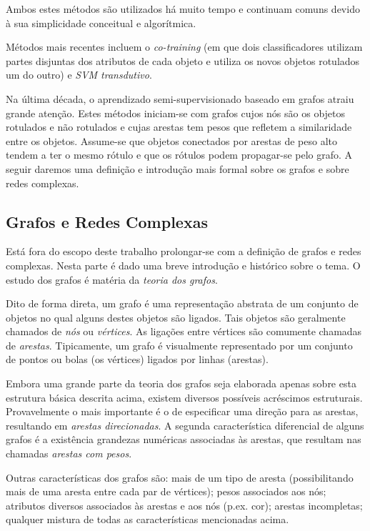 \documentclass[12pt]{article}
\begin{document}
Ambos estes métodos são utilizados há muito tempo e continuam comuns devido à sua simplicidade conceitual e algorítmica.

Métodos mais recentes incluem o \emph{co-training} (em que dois classificadores utilizam partes disjuntas dos atributos de cada objeto e utiliza os novos objetos rotulados um do outro) e \emph{SVM transdutivo}.

Na última década, o aprendizado semi-supervisionado baseado em grafos atraiu grande atenção. Estes métodos iniciam-se com grafos cujos nós são os objetos rotulados e não rotulados e cujas arestas tem pesos que refletem a similaridade entre os objetos. Assume-se que objetos conectados por arestas de peso alto tendem a ter o mesmo rótulo e que os rótulos podem propagar-se pelo grafo. A seguir daremos uma definição e introdução mais formal sobre os grafos e sobre redes complexas.

\subsection{Grafos e Redes Complexas}
Está fora do escopo deste trabalho prolongar-se com a definição de grafos e redes complexas. Nesta parte é dado uma breve introdução e histórico sobre o tema. O estudo dos grafos é matéria da \emph{teoria dos grafos}.

Dito de forma direta, um grafo é uma representação abstrata de um conjunto de objetos no qual alguns destes objetos são ligados. Tais objetos são geralmente chamados de \emph{nós} ou \emph{vértices}. As ligações entre vértices são comumente chamadas de \emph{arestas}. Tipicamente, um grafo é visualmente representado por um conjunto de pontos ou bolas (os vértices) ligados por linhas (arestas).

Embora uma grande parte da teoria dos grafos seja elaborada apenas sobre esta estrutura básica descrita acima, existem diversos possíveis acréscimos estruturais. Provavelmente o mais importante é o de especificar uma direção para as arestas, resultando em \emph{arestas direcionadas}. A segunda característica diferencial de alguns grafos é a existência grandezas numéricas associadas às arestas, que resultam nas chamadas \emph{arestas com pesos}.

Outras características dos grafos são: mais de um tipo de aresta (possibilitando mais de uma aresta entre cada par de vértices); pesos associados aos nós; atributos diversos associados às arestas e aos nós (p.ex. cor); arestas incompletas; qualquer mistura de todas as características mencionadas acima.
\end{document}
